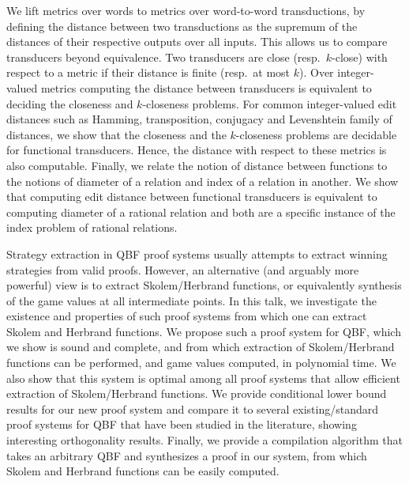 \documentclass[a4paper,UKenglish]{dagrep-v2021}
\begin{document}

We lift metrics over words to metrics over word-to-word transductions, by defining the distance between two transductions as the supremum of the distances of their respective outputs over all inputs. This allows us to compare transducers beyond equivalence. Two transducers are close (resp.\ $k$-close) with respect to a metric if their distance is finite (resp.\ at most $k$). Over integer-valued metrics computing the distance between transducers is equivalent to deciding the closeness and $k$-closeness problems. For common integer-valued edit distances such as Hamming, transposition, conjugacy and Levenshtein family of distances, we show that the closeness and the $k$-closeness problems are decidable for functional transducers. Hence, the distance with respect to these metrics is also computable. Finally, we relate the notion of distance between functions to the notions of diameter of a relation and index of a relation in another. We show that computing edit distance between functional transducers is equivalent to computing diameter of a rational relation and both are a specific instance of the index problem of rational relations.


Strategy extraction in QBF proof systems usually attempts to extract winning strategies from valid proofs. However, an alternative (and arguably more powerful) view is to extract Skolem/Herbrand functions, or equivalently synthesis of the game values at all intermediate points. In this talk, we investigate the existence and properties of such proof systems from which one can extract Skolem and Herbrand functions. We propose such a proof system for QBF, which we show is sound and complete, and from which extraction of Skolem/Herbrand functions can be performed, and game values computed, in polynomial time. We also show that this system is optimal among all proof systems that allow efficient extraction of Skolem/Herbrand functions. We provide conditional lower bound results for our new proof system and compare it to several existing/standard proof systems for QBF that have been studied in the literature, showing interesting orthogonality results. Finally, we provide a compilation algorithm that takes an arbitrary QBF and synthesizes a proof in our system, from which Skolem and Herbrand functions can be easily computed.
\end{document}
